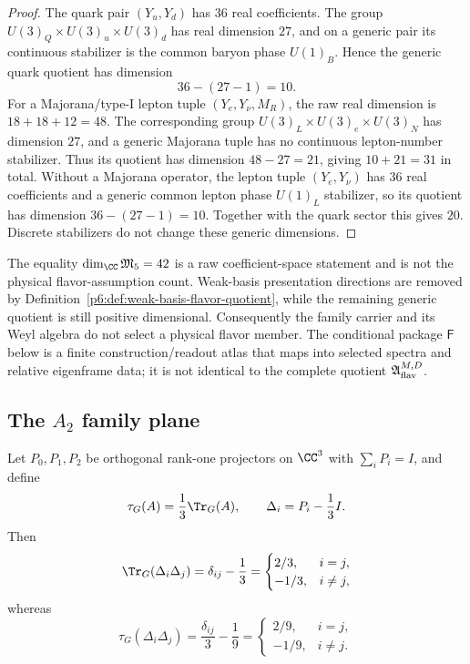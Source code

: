 \documentclass[12pt,a4paper]{article}
\begin{document}
\begin{proof}
The quark pair \((Y_u,Y_d)\) has \(36\) real coefficients.  The group
\(U(3)_Q\times U(3)_u\times U(3)_d\) has real dimension \(27\), and on a
generic pair its continuous stabilizer is the common baryon phase
\(U(1)_B\).  Hence the generic quark quotient has dimension
\[
36-(27-1)=10.
\]
For a Majorana/type-I lepton tuple
\((Y_e,Y_\nu,M_R)\), the raw real dimension is
\(18+18+12=48\).  The corresponding group
\(U(3)_L\times U(3)_e\times U(3)_N\) has dimension \(27\), and a generic
Majorana tuple has no continuous lepton-number stabilizer.  Thus its quotient
has dimension \(48-27=21\), giving \(10+21=31\) in total.  Without a
Majorana operator, the lepton tuple \((Y_e,Y_\nu)\) has \(36\) real
coefficients and a generic common lepton phase \(U(1)_L\) stabilizer, so its
quotient has dimension \(36-(27-1)=10\).  Together with the quark sector this
gives \(20\).  Discrete stabilizers do not change these generic dimensions.
\end{proof}

\begin{corollary}
\label{p6:cor:raw-versus-physical-flavor}
The equality
\(\dim_\CC\mathfrak M_5=42\) is a raw coefficient-space statement and is not
the physical flavor-assumption count.  Weak-basis presentation directions are
removed by Definition~\ref{p6:def:weak-basis-flavor-quotient}, while the
remaining generic quotient is still positive dimensional.  Consequently the
family carrier and its Weyl algebra do not select a physical flavor member.
The conditional package \(\mathsf F\) below is a finite construction/readout
atlas that maps into selected spectra and relative eigenframe data; it is not
identical to the complete quotient \(\mathfrak A_{\rm flav}^{M,D}\).
\end{corollary}

\subsection{\texorpdfstring{The \(A_2\) family plane}{The A2 family plane}}
\label{p6:sec:a2-plane}

\begin{theorem}
\label{p6:thm:a2-trace}
Let \(P_0,P_1,P_2\) be orthogonal rank-one projectors on \(\CC^3\) with
\(\sum_iP_i=I\), and define
\[
\tau_G(A)=\frac13\Tr_G(A),
\qquad
\Delta_i=P_i-\frac13I.
\]
Then
\[
\Tr_G(\Delta_i\Delta_j)=\delta_{ij}-\frac13
=
\begin{cases}
2/3,&i=j,\\
-1/3,&i\ne j,
\end{cases}
\]
whereas
\[
\tau_G(\Delta_i\Delta_j)
=\frac{\delta_{ij}}3-\frac19
=
\begin{cases}
2/9,&i=j,\\
-1/9,&i\ne j.
\end{cases}
\]
\end{theorem}
\end{document}
